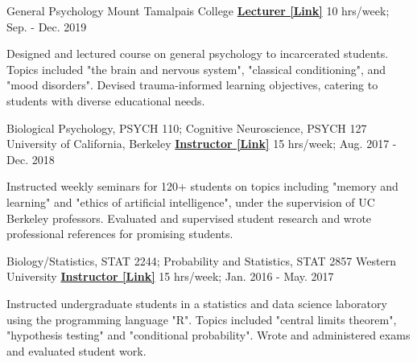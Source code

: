 

\begin{cventries}


  \cventry
    {General Psychology} %
    {Mount Tamalpais College} %
    {\href{https://docs.google.com/document/d/1CCjwp7zmqr76HUuSvEF3AMZFzeTBhddgNd5zSgZBDeA/edit?usp=sharing}{\textbf{Lecturer [Link]}}} %
    {10 hrs/week; Sep. - Dec. 2019} %
    {
      \begin{cvitems} %
        \item {Designed and lectured course on general psychology to incarcerated students. Topics included "the brain and nervous system", "classical conditioning", and "mood disorders". Devised trauma-informed learning objectives, catering to students with diverse educational needs.}  
      \end{cvitems}
    }
    
  \cventry
  	{Biological Psychology, PSYCH 110; Cognitive Neuroscience, PSYCH 127} %
	{University of California, Berkeley} %
    {\href{https://docs.google.com/document/d/1rZl_JGgukSODwxE-vGzaTSg-20NvZqk4/edit?usp=sharing&ouid=110847987931723045299&rtpof=true&sd=true}{\textbf{Instructor [Link]}}} %
    {15 hrs/week; Aug. 2017 - Dec. 2018} %
    {
      \begin{cvitems} %
        \item {Instructed weekly seminars for 120+ students on topics including "memory and learning" and "ethics of artificial intelligence", under the supervision of UC Berkeley professors. Evaluated and supervised student research and wrote professional references for promising students.}
      \end{cvitems}
    }
    
  \cventry
  	{Biology/Statistics, STAT 2244; Probability and Statistics, STAT 2857} %
	{Western University} %
    {\href{https://drive.google.com/file/d/1vOkiycHtsmuYfOwiYWny_tI0iOJ-Km9m/view?usp=sharing}{\textbf{Instructor [Link]}}} %
    {15 hrs/week; Jan. 2016 - May. 2017} %
    {
      \begin{cvitems} %
        \item {Instructed undergraduate students in a statistics and data science laboratory using the programming language "R". Topics included "central limits theorem", "hypothesis testing" and "conditional probability". Wrote and administered exams and evaluated student work.}
      \end{cvitems}
    }
    
    
\end{cventries}

